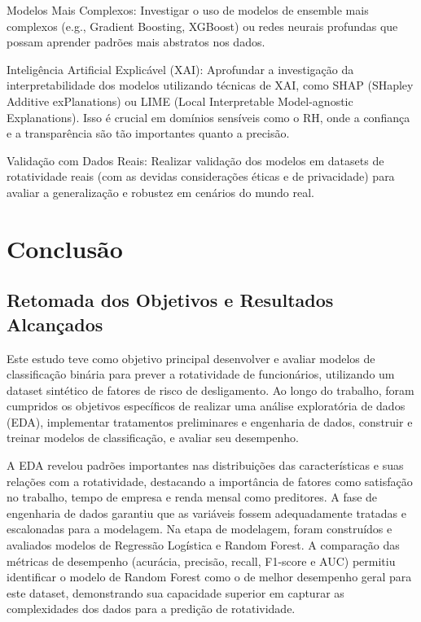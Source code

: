 \documentclass[sigconf]{acmart}
\begin{document}
Modelos Mais Complexos: Investigar o uso de modelos de ensemble mais complexos (e.g., Gradient Boosting, XGBoost) ou redes neurais profundas que possam aprender padrões mais abstratos nos dados.

Inteligência Artificial Explicável (XAI): Aprofundar a investigação da interpretabilidade dos modelos utilizando técnicas de XAI, como SHAP (SHapley Additive exPlanations) ou LIME (Local Interpretable Model-agnostic Explanations). Isso é crucial em domínios sensíveis como o RH, onde a confiança e a transparência são tão importantes quanto a precisão.

Validação com Dados Reais: Realizar validação dos modelos em datasets de rotatividade reais (com as devidas considerações éticas e de privacidade) para avaliar a generalização e robustez em cenários do mundo real.

\section{Conclusão}
\subsection{Retomada dos Objetivos e Resultados Alcançados}
Este estudo teve como objetivo principal desenvolver e avaliar modelos de classificação binária para prever a rotatividade de funcionários, utilizando um dataset sintético de fatores de risco de desligamento. Ao longo do trabalho, foram cumpridos os objetivos específicos de realizar uma análise exploratória de dados (EDA), implementar tratamentos preliminares e engenharia de dados, construir e treinar modelos de classificação, e avaliar seu desempenho.

A EDA revelou padrões importantes nas distribuições das características e suas relações com a rotatividade, destacando a importância de fatores como satisfação no trabalho, tempo de empresa e renda mensal como preditores. A fase de engenharia de dados garantiu que as variáveis fossem adequadamente tratadas e escalonadas para a modelagem. Na etapa de modelagem, foram construídos e avaliados modelos de Regressão Logística e Random Forest. A comparação das métricas de desempenho (acurácia, precisão, recall, F1-score e AUC) permitiu identificar o modelo de Random Forest como o de melhor desempenho geral para este dataset, demonstrando sua capacidade superior em capturar as complexidades dos dados para a predição de rotatividade.
\end{document}
